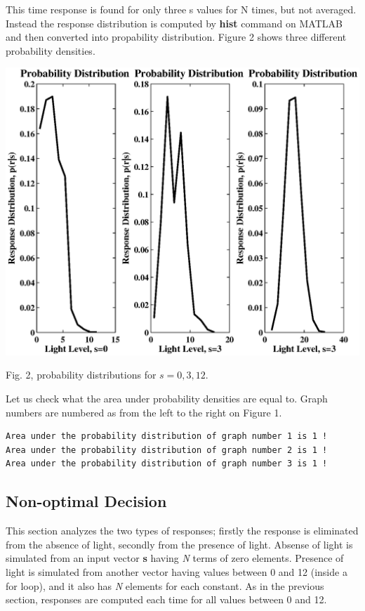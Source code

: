\documentclass{article}
\begin{document}
This time response is found for only three s values for N times, but not averaged. Instead the response distribution is computed by \textbf{hist} command on MATLAB and then converted into propability distribution. Figure 2 shows three different probability densities. 

 \begin{center}
 \includegraphics[width=\textwidth]{prob_dist.eps}
\begin{footnotesize} Fig. 2, probability distributions for $s=0,3,12$. 
\end{footnotesize}
\end{center}

Let us check what the area under probability densities are equal to. Graph numbers are numbered as from the left to the right on Figure 1. 

\begin{lstlisting}
Area under the probability distribution of graph number 1 is 1 ! 
Area under the probability distribution of graph number 2 is 1 ! 
Area under the probability distribution of graph number 3 is 1 !
\end{lstlisting}

\subsection{Non-optimal Decision}

This section analyzes the two types of responses; firstly the response is eliminated from the absence of light, secondly from the presence of light. Absense of light is simulated from an input vector \textbf{s} having \textit{N} terms of zero elements. Presence of light is simulated from another vector having values between 0 and 12 (inside a for loop), and it also has \textit{N} elements for each constant. As in the previous section, responses are computed each time for all values between 0 and 12.\\
\end{document}
